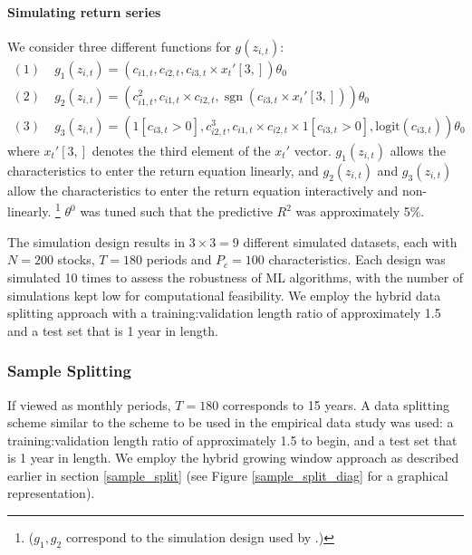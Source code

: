 \documentclass{article}
\begin{document}
\paragraph{Simulating return series}
We consider three different functions for $g(z_{i, t})$:
\begin{align}
(1)\; & g_1 \left(z_{i, t}\right)=\left(c_{i 1, t}, c_{i 2, t}, c_{i 3, t} \times x_{t}'[3,]\right) \theta_{0} \\
(2)\; & g_2 \left(z_{i, t}\right)=\left(c_{i 1, t}^{2}, c_{i 1, t} \times c_{i 2, t}, \operatorname{sgn}\left(c_{i 3, t} \times  x_{t}'[3,]\right)\right) \theta_{0} \\
(3)\; & g_3 \left(z_{i, t}\right) = \left(1[c_{i3,t}>0],c_{i 2, t}^{3}, c_{i 1, t} \times c_{i 2, t}\times 1[c_{i3,t}>0], \text{logit}\left({c}_{i3, t} \right)\right) \theta_{0}
\end{align}
where $x_{t}'[3,]$ denotes the third element of the $x_{t}'$ vector.
$g_1 \left(z_{i, t}\right)$ allows the characteristics to enter the return equation linearly, and $g_2 \left(z_{i, t}\right)$ and $g_3 \left(z_{i, t}\right)$ allow the characteristics to enter the return equation interactively and non-linearly. \footnote{($g_1, g_2$ correspond to the simulation design used by \cite{gu_empirical_2018}.)} $\theta^0$ was tuned such that the predictive $R^2$ was approximately 5\%.

The simulation design results in $3 \times 3 = 9$ different simulated datasets, each with $N = 200$ stocks, $T = 180$ periods and $P_c = 100$ characteristics. Each design was simulated 10 times to assess the robustness of ML algorithms, with the number of simulations kept low for computational feasibility. We employ the hybrid data splitting approach with a training:validation length ratio of approximately 1.5 and a test set that is 1 year in length. 

\subsubsection{Sample Splitting}

If viewed as monthly periods, $T = 180$ corresponds to 15 years. A data splitting scheme similar to the scheme to be used in the empirical data study was used: a training:validation length ratio of approximately 1.5 to begin, and a test set that is 1 year in length. We employ the hybrid growing window approach as described earlier in section \ref{sample_split} (see Figure \ref{sample_split_diag} for a graphical representation).
\end{document}
